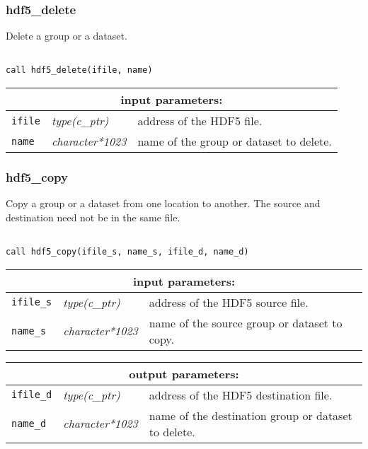 \vskip 0.8cm

\subsubsection{hdf5\_delete}

Delete a group or a dataset.

\begin{verbatim}

call hdf5_delete(ifile, name)
\end{verbatim}

\noindent
\begin{tabular}{|p{1.5cm}|p{3cm}|p{10cm}|}
\hline
\multicolumn{3}{|c|}{\bf input parameters:} \\
\hline
{\tt ifile} & {\it type(c\_ptr)} & address of the HDF5 file. \\
\hline
{\tt name} & {\it character*1023} & name of the group or dataset to delete. \\
\hline
\end{tabular}

\vskip 0.8cm

\subsubsection{hdf5\_copy}

Copy a group or a dataset from one location to another. The source and destination need not be in the same file.

\begin{verbatim}

call hdf5_copy(ifile_s, name_s, ifile_d, name_d)
\end{verbatim}

\noindent
\begin{tabular}{|p{1.5cm}|p{3cm}|p{10cm}|}
\hline
\multicolumn{3}{|c|}{\bf input parameters:} \\
\hline
{\tt ifile\_s} & {\it type(c\_ptr)} & address of the HDF5 source file. \\
\hline
{\tt name\_s} & {\it character*1023} & name of the source group or dataset to copy. \\
\hline
\end{tabular}

\vskip 0.8cm

\noindent
\begin{tabular}{|p{1.5cm}|p{3cm}|p{10cm}|}
\hline
\multicolumn{3}{|c|}{\bf output parameters:} \\
\hline
{\tt ifile\_d} & {\it type(c\_ptr)} & address of the HDF5 destination file. \\
\hline
{\tt name\_d} & {\it character*1023} & name of the destination group or dataset to delete. \\
\hline
\end{tabular}

